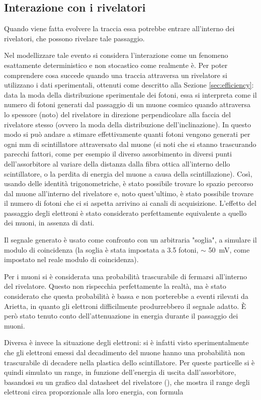 \subsection{Interazione con i rivelatori}
Quando viene fatta evolvere la traccia essa potrebbe entrare all'interno dei rivelatori, che possono rivelare tale passaggio. 

Nel modellizzare tale evento si considera l'interazione come un fenomeno esattamente deterministico e non stocastico come realmente è. 
Per poter comprendere cosa succede quando una traccia attraversa un rivelatore si utilizzano i dati sperimentali, ottenuti come descritto alla Sezione \ref{sec:efficiency}: data la moda della distribuzione sperimentale dei fotoni, essa si interpreta come il numero di fotoni generati dal passaggio di un muone cosmico quando attraversa lo spessore (noto) del rivelatore in direzione perpendicolare alla faccia del rivelatore stesso (ovvero la moda della distribuzione dell'inclinazione). 
In questo modo si può andare a stimare effettivamente quanti fotoni vengono generati per ogni mm di scintillatore attraversato dal muone (si noti che si stanno trascurando parecchi fattori, come per esempio il diverso assorbimento in diversi punti dell'assorbitore al variare della distanza dalla fibra ottica all'interno dello scintillatore, o la perdita di energia del muone a causa della scintillazione). 
Così, usando delle identità trigonometriche, è stato possibile trovare lo spazio percorso dal muone all'interno del rivelatore e, noto quest'ultimo, è stato possibile trovare il numero di fotoni che ci si aspetta arrivino ai canali di acquisizione. 
L'effetto del passaggio degli elettroni \`e stato considerato perfettamente equivalente a quello dei muoni, in assenza di dati.

Il segnale generato \`e usato come confronto con un arbitraria "soglia", a simulare il modulo di coincidenza (la soglia \`e stata impostata a 3.5 fotoni, $\sim$ 50~mV, come impostato nel reale modulo di coincidenza).

Per i muoni si \`e considerata una probabilit\`a trascurabile di fermarsi all'interno del rivelatore. Questo non rispecchia perfettamente la realt\`a, ma \`e stato considerato che questa probabilit\`a \`e bassa e  non porterebbe a eventi rilevati da Arietta, in quanto gli elettroni difficilmente produrrebbero il segnale adatto. \`E per\`o stato tenuto conto dell'attenuazione in energia durante il passaggio dei muoni.

Diversa \`e invece la situazione degli elettroni: si \`e infatti visto sperimentalmente che gli elettroni emessi dal decadimento del muone hanno una probabilit\`a non trascurabile di decadere nella plastica dello scintillatore. Per queste particelle si \`e quindi simulato un range, in funzione dell'energia di uscita dall'assorbitore, basandosi su un grafico dal datasheet del rivelatore (\cite{bib:SiPM}), che mostra il range degli elettroni circa proporzionale alla loro energia, con formula

